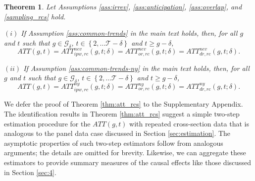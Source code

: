 \documentclass[11pt]{article}%
\theoremstyle{plain}
\newtheorem{theorem}{Theorem}
\numberwithin{sassumption}{section}
\numberwithin{equation}{section}
\begin{document}
\begin{theorem}
{\small \label{thm:att_rcs} Let Assumptions \ref{ass:irrev},
\ref{ass:anticipation}, \ref{ass:overlap}, and \ref{sampling_rcs} hold. }

{\small $\left(  i\right)  $ If Assumption \ref{ass:common-trends} in the main
text holds, then, for all $g$ and $t$ such that $g\in\mathcal{G}_{\delta}$,
$t\in\left\{  2,\dots\mathcal{T-\delta}\right\}  $ and $t\geq g-\delta$,%
\[
ATT\left(  g,t\right)  =ATT_{ipw,rc}^{nev}\left(  g,t;\delta\right)
=ATT_{or,rc}^{nev}\left(  g,t;\delta\right)  =ATT_{dr,rc}^{nev}\left(
g,t;\delta\right)  .
\]
}

{\small $\left(  ii\right)  $ If Assumption \ref{ass:common-trends-ny} in the
main text holds, then, for all $g$ and $t$ such that $g\in\mathcal{G}_{\delta
}$, $t\in\left\{  2,\dots\mathcal{T-\delta}\right\}  $ and $t\geq g-\delta$,%
\[
ATT\left(  g,t\right)  =ATT_{ipw,rc}^{ny}\left(  g,t;\delta\right)
=ATT_{or,rc}^{ny}\left(  g,t;\delta\right)  =ATT_{dr,rc}^{ny}\left(
g,t;\delta\right)  .
\]
}
\end{theorem}

{\small We defer the proof of Theorem \ref{thm:att_rcs} to the Supplementary
Appendix. The identification results in Theorem \ref{thm:att_rcs} suggest a
simple two-step estimation procedure for the $ATT(g,t)$ with repeated
cross-section data that is analogous to the panel data case discussed in
Section \ref{sec:estimation}. The asymptotic properties of such two-step
estimators follow from analogous arguments; the details are omitted for
brevity. Likewise, we can aggregate these estimators to provide summary
measures of the causal effects like those discussed in Section \ref{sec:4}. }

\onehalfspacing{\small


}
\end{document}
